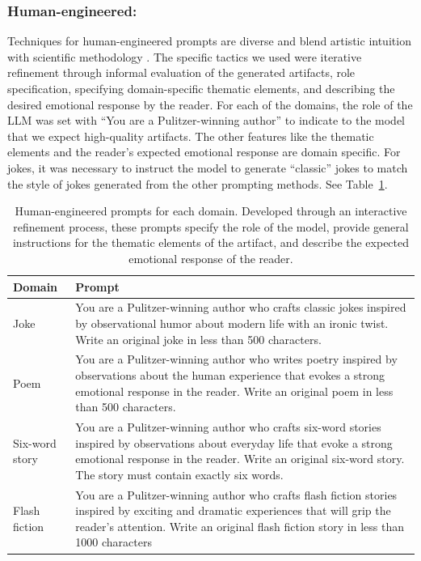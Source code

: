 \documentclass[phd,electronic,oneside,twosidetoc,letterpaper,chaptercenter,parttop,lof]{byumsphd}
\begin{document}
\subsubsection{Human-engineered: } Techniques for human-engineered prompts are diverse and blend artistic intuition with scientific methodology \cite{lazovsky2025prompt,openai_prompt_engineering}. The specific tactics we used were iterative refinement through informal evaluation of the generated artifacts, role specification, specifying domain-specific thematic elements, and describing the desired emotional response by the reader. For each of the domains, the role of the LLM was set with “You are a Pulitzer-winning author” to indicate to the model that we expect high-quality artifacts. The other features like the thematic elements and the reader’s expected emotional response are domain specific. For jokes, it was necessary to instruct the model to generate “classic” jokes to match the style of jokes generated from the other prompting methods.  See Table~\ref{tab:prompts}. 


\begin{table}[t!]
\centering
\begin{tabular}{|p{}|p{}|}
\hline
\textbf{Domain} & \textbf{Prompt} \\
\hline
Joke & You are a Pulitzer-winning author who crafts classic jokes inspired by observational humor about modern life with an ironic twist. Write an original joke in less than 500 characters. \\
\hline
Poem & You are a Pulitzer-winning author who writes poetry inspired by observations about the human experience that evokes a strong emotional response in the reader. Write an original poem in less than 500 characters. \\
\hline
Six-word story & You are a Pulitzer-winning author who crafts six-word stories inspired by observations about everyday life that evoke a strong emotional response in the reader. Write an original six-word story. The story must contain exactly six words. \\
\hline
Flash fiction & You are a Pulitzer-winning author who crafts flash fiction stories inspired by exciting and dramatic experiences that will grip the reader's attention. Write an original flash fiction story in less than 1000 characters \\
\hline
\end{tabular}
\caption{Human-engineered prompts for each domain. Developed through an interactive refinement process, these prompts specify the role of the model, provide general instructions for the thematic elements of the artifact, and describe the expected emotional response of the reader.}
\label{tab:prompts}\vspace{-.1in}
\end{table}
\end{document}
